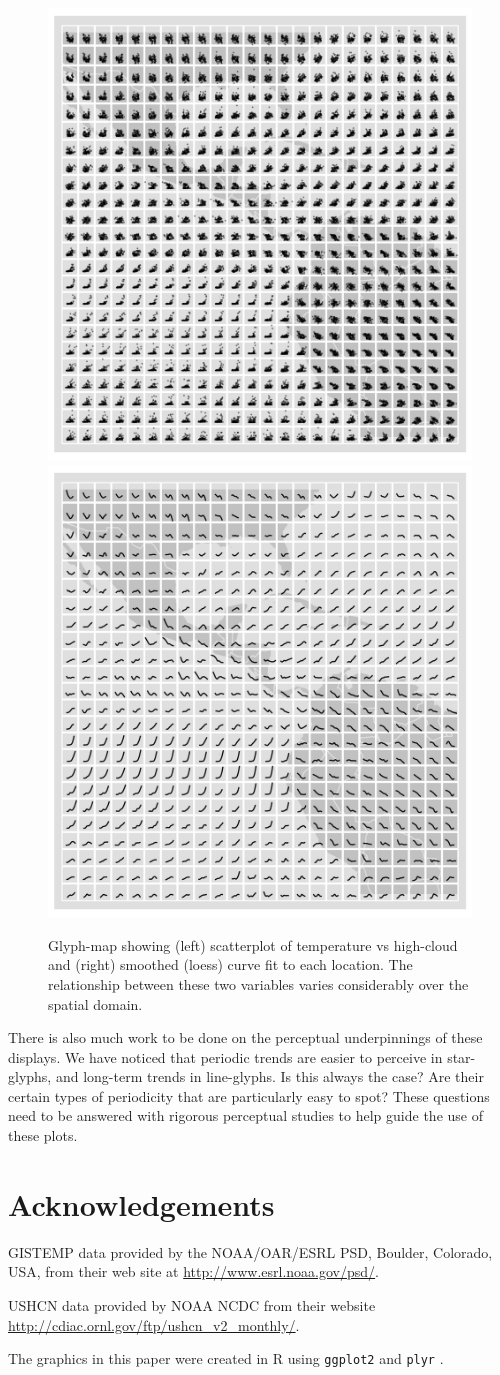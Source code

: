 \documentclass[oneside]{article}
\begin{document}
\begin{figure}[htbp]
  \centering
  \includegraphics[width=0.5\linewidth]{nasa-scat-glyph}%
  \includegraphics[width=0.5\linewidth]{nasa-loess-glyph}

  \caption{Glyph-map showing (left) scatterplot of temperature vs high-cloud and (right) smoothed (loess) curve fit to each location. The relationship between these two variables varies considerably over the spatial domain. }
  \label{fig:cloud}
\end{figure}

There is also much work to be done on the perceptual underpinnings of these displays. We have noticed that periodic trends are easier to perceive in star-glyphs, and long-term trends in line-glyphs. Is this always the case? Are their certain types of periodicity that are particularly easy to spot? These questions need to be answered with rigorous perceptual studies to help guide the use of these plots.

\section*{Acknowledgements}

GISTEMP data provided by the NOAA/OAR/ESRL PSD, Boulder, Colorado,
USA, from their web site at \url{http://www.esrl.noaa.gov/psd/}.

USHCN data provided by NOAA NCDC from their website \url{http://cdiac.ornl.gov/ftp/ushcn_v2_monthly/}.

The graphics in this paper were created in R \citep{R} using {\tt ggplot2} \citep{me:ggplot2} and {\tt plyr} \citep{me:plyr}. 


\end{document}
